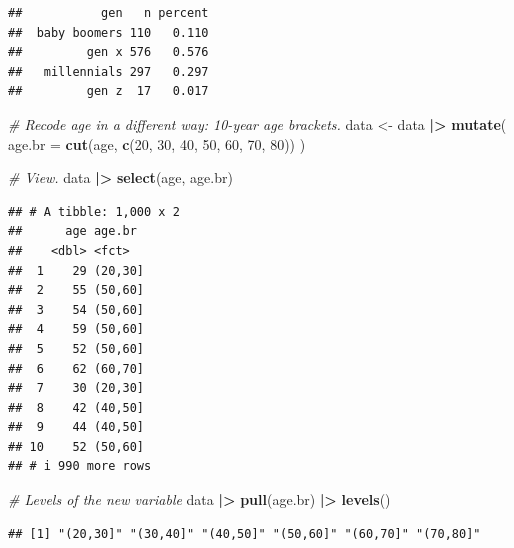 \documentclass[
]{book}
\newenvironment{Shaded}{\begin{snugshade}}{\end{snugshade}}
\newcommand{\AttributeTok}[1]{\textcolor[rgb]{0.13,0.29,0.53}{#1}}
\newcommand{\CommentTok}[1]{\textcolor[rgb]{0.56,0.35,0.01}{\textit{#1}}}
\newcommand{\DecValTok}[1]{\textcolor[rgb]{0.00,0.00,0.81}{#1}}
\newcommand{\FunctionTok}[1]{\textcolor[rgb]{0.13,0.29,0.53}{\textbf{#1}}}
\newcommand{\NormalTok}[1]{#1}
\newcommand{\OtherTok}[1]{\textcolor[rgb]{0.56,0.35,0.01}{#1}}
\newcommand{\SpecialCharTok}[1]{\textcolor[rgb]{0.81,0.36,0.00}{\textbf{#1}}}
\begin{document}
\begin{verbatim}
##           gen   n percent
##  baby boomers 110   0.110
##         gen x 576   0.576
##   millennials 297   0.297
##         gen z  17   0.017
\end{verbatim}

\begin{Shaded}
\begin{Highlighting}[]
\CommentTok{\# Recode age in a different way: 10{-}year age brackets.}
\NormalTok{data }\OtherTok{\textless{}{-}}\NormalTok{ data }\SpecialCharTok{|\textgreater{}} 
  \FunctionTok{mutate}\NormalTok{(}
    \AttributeTok{age.br =} \FunctionTok{cut}\NormalTok{(age, }\FunctionTok{c}\NormalTok{(}\DecValTok{20}\NormalTok{, }\DecValTok{30}\NormalTok{, }\DecValTok{40}\NormalTok{, }\DecValTok{50}\NormalTok{, }\DecValTok{60}\NormalTok{, }\DecValTok{70}\NormalTok{, }\DecValTok{80}\NormalTok{))}
\NormalTok{  )}

\CommentTok{\# View.}
\NormalTok{data }\SpecialCharTok{|\textgreater{}} 
  \FunctionTok{select}\NormalTok{(age, age.br)}
\end{Highlighting}
\end{Shaded}

\begin{verbatim}
## # A tibble: 1,000 x 2
##      age age.br 
##    <dbl> <fct>  
##  1    29 (20,30]
##  2    55 (50,60]
##  3    54 (50,60]
##  4    59 (50,60]
##  5    52 (50,60]
##  6    62 (60,70]
##  7    30 (20,30]
##  8    42 (40,50]
##  9    44 (40,50]
## 10    52 (50,60]
## # i 990 more rows
\end{verbatim}

\begin{Shaded}
\begin{Highlighting}[]
\CommentTok{\# Levels of the new variable}
\NormalTok{data }\SpecialCharTok{|\textgreater{}} 
  \FunctionTok{pull}\NormalTok{(age.br) }\SpecialCharTok{|\textgreater{}} 
  \FunctionTok{levels}\NormalTok{()}
\end{Highlighting}
\end{Shaded}

\begin{verbatim}
## [1] "(20,30]" "(30,40]" "(40,50]" "(50,60]" "(60,70]" "(70,80]"
\end{verbatim}
\end{document}
